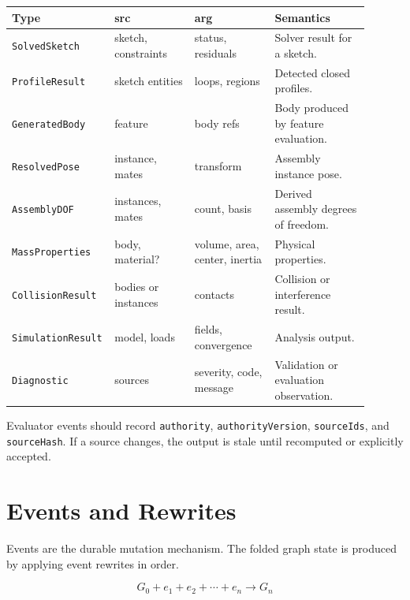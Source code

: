 \documentclass[11pt]{article}
\newcommand{\Type}[1]{\texttt{#1}}
\begin{document}
\begin{center}
\small
\begin{tabular}{@{}p{0.20\linewidth}p{0.22\linewidth}p{0.22\linewidth}p{0.26\linewidth}@{}}
\hline
\textbf{Type} & \textbf{src} & \textbf{arg} & \textbf{Semantics} \\
\hline
\Type{SolvedSketch} & sketch, constraints & status, residuals & Solver result for a sketch. \\
\Type{ProfileResult} & sketch entities & loops, regions & Detected closed profiles. \\
\Type{GeneratedBody} & feature & body refs & Body produced by feature evaluation. \\
\Type{ResolvedPose} & instance, mates & transform & Assembly instance pose. \\
\Type{AssemblyDOF} & instances, mates & count, basis & Derived assembly degrees of freedom. \\
\Type{MassProperties} & body, material? & volume, area, center, inertia & Physical properties. \\
\Type{CollisionResult} & bodies or instances & contacts & Collision or interference result. \\
\Type{SimulationResult} & model, loads & fields, convergence & Analysis output. \\
\Type{Diagnostic} & sources & severity, code, message & Validation or evaluation observation. \\
\hline
\end{tabular}
\end{center}

Evaluator events should record \Type{authority}, \Type{authorityVersion}, \Type{sourceIds}, and \Type{sourceHash}. If a source changes, the output is stale until recomputed or explicitly accepted.

\section{Events and Rewrites}

Events are the durable mutation mechanism. The folded graph state is produced by applying event rewrites in order.

\[
G_0 + e_1 + e_2 + \cdots + e_n \rightarrow G_n
\]
\end{document}
